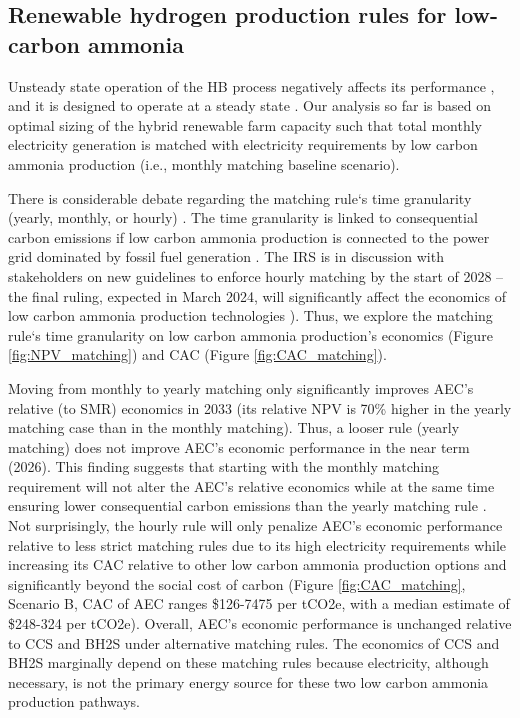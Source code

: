 \documentclass{article}
\begin{document}
\subsection*{Renewable hydrogen production rules for low-carbon ammonia}

Unsteady state operation of the HB process negatively affects its performance \cite{Armijo2020}, and it is designed to operate at a steady state \cite{Bouaboula2023, Bose2022}. Our analysis so far is based on optimal sizing of the hybrid renewable farm capacity such that total monthly electricity generation is matched with electricity requirements by low carbon ammonia production (i.e., monthly matching baseline scenario).

There is considerable debate regarding the matching rule‘s time granularity (yearly, monthly, or hourly) . The time granularity is linked to consequential carbon emissions if low carbon ammonia production is connected to the power grid dominated by fossil fuel generation \cite{Cybulsky2023, Ricks2023, BCG2023, Riley2023, Ruhnau2023}. The IRS is in discussion with stakeholders on new guidelines to enforce hourly matching by the start of 2028 – the final ruling, expected in March 2024, will significantly affect the economics of low carbon ammonia production technologies \cite{IRS2023}). Thus, we explore the matching rule‘s time granularity on low carbon ammonia production’s economics (Figure \ref{fig:NPV_matching}) and CAC (Figure \ref{fig:CAC_matching}).

Moving from monthly to yearly matching only significantly improves AEC’s relative (to SMR) economics in 2033 (its relative NPV is 70\% higher in the yearly matching case than in the monthly matching). Thus, a looser rule (yearly matching) does not improve AEC’s economic performance in the near term (2026). This finding suggests that starting with the monthly matching requirement will not alter the AEC’s relative economics while at the same time ensuring lower consequential carbon emissions than the yearly matching rule . Not surprisingly, the hourly rule will only penalize AEC’s economic performance relative to less strict matching rules due to its high electricity requirements while increasing its CAC relative to other low carbon ammonia production options and significantly beyond the social cost of carbon (Figure \ref{fig:CAC_matching}, Scenario B, CAC of AEC ranges \$126-7475 per tCO2e, with a median estimate of \$248-324 per tCO2e). Overall, AEC’s economic performance is unchanged relative to CCS and BH2S under alternative matching rules. The economics of CCS and BH2S marginally depend on these matching rules because electricity, although necessary, is not the primary energy source for these two low carbon ammonia production pathways.
\end{document}
